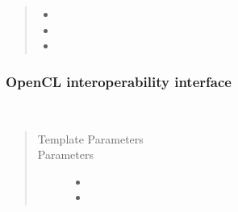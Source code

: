 \documentclass[letterpaper,10pt,english]{sphinxmanual}
\begin{document}
\begin{fulllineitems}
\begin{fulllineitems}
\begin{quote}
\begin{description}
\begin{itemize}
\item {} 
 \textendash{} 

\item {} 
 \textendash{} 

\item {} 
 \textendash{} 

\end{itemize}

\end{description}\end{quote}

\end{fulllineitems}

\subsubsection*{OpenCL interoperability interface}

\begin{fulllineitems}
\label{\detokenize{programming-interface/parallelism/command-group-handler:_CPPv4I0EN7handler7set_argEviRR1T}}%
\pysigstartmultiline
{}%
\pysigstopmultiline~\begin{quote}\begin{description}
\item[{Template Parameters}] \leavevmode
{} \textendash{} 

\item[{Parameters}] \leavevmode\begin{itemize}
\item {} 
 \textendash{} 

\item {} 
 \textendash{} 

\end{itemize}

\end{description}\end{quote}


\end{fulllineitems}
\end{fulllineitems}
\end{document}
